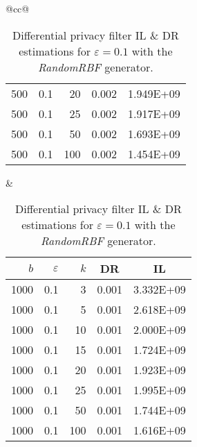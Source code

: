 \begin{table}[H]
\begin{tabular}{@{}cc@{}}
\begin{tabular}{@{}rrrrr@{}}
			500 & 0.1 & 20  & 0.002 & 1.949E+09 \\
			500 & 0.1 & 25  & 0.002 & 1.917E+09 \\
			500 & 0.1 & 50  & 0.002 & 1.693E+09 \\
			500 & 0.1 & 100 & 0.002 & 1.454E+09 \\ \bottomrule
		\end{tabular}
		&
		\begin{tabular}{@{}rrrrr@{}}
			\toprule
			$b$ & $\varepsilon$ & $k$ & \multicolumn{1}{c}{DR} & \multicolumn{1}{c}{IL} \\ \midrule
			1000 & 0.1 & 3   & 0.001 & 3.332E+09 \\
			1000 & 0.1 & 5   & 0.001 & 2.618E+09 \\
			1000 & 0.1 & 10  & 0.001 & 2.000E+09 \\
			1000 & 0.1 & 15  & 0.001 & 1.724E+09 \\
			1000 & 0.1 & 20  & 0.001 & 1.923E+09 \\
			1000 & 0.1 & 25  & 0.001 & 1.995E+09 \\
			1000 & 0.1 & 50  & 0.001 & 1.744E+09 \\
			1000 & 0.1 & 100 & 0.001 & 1.616E+09 \\ \bottomrule
		\end{tabular}
	\end{tabular}
	\caption[Differential privacy filter DR \& IL estimations (RandomRBF), $\varepsilon = 0.1$.]{Differential privacy filter IL \& DR estimations for $\varepsilon = 0.1$ with the \textit{RandomRBF} generator.}
	\label{table:results-rbf-diff-priv-e0.1}
\end{table}


